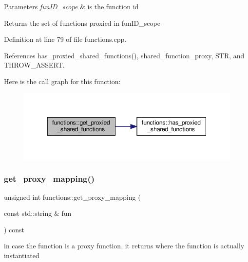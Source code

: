 \begin{DoxyParams}{Parameters}
{\em fun\+I\+D\+\_\+scope} & is the function id \\
\hline
\end{DoxyParams}
\begin{DoxyReturn}{Returns}
the set of functions proxied in fun\+I\+D\+\_\+scope 
\end{DoxyReturn}


Definition at line 79 of file functions.\+cpp.



References has\+\_\+proxied\+\_\+shared\+\_\+functions(), shared\+\_\+function\+\_\+proxy, S\+TR, and T\+H\+R\+O\+W\+\_\+\+A\+S\+S\+E\+RT.

Here is the call graph for this function\+:
\nopagebreak
\begin{figure}[H]
\begin{center}
\leavevmode
\includegraphics[width=344pt]{dd/d03/classfunctions_a0dc27d773ab21876d91082e54b100780_cgraph}
\end{center}
\end{figure}
\mbox{\label{classfunctions_aad881194f6ac949db8171c00ec263021}} 
\subsubsection{\texorpdfstring{get\+\_\+proxy\+\_\+mapping()}{get\_proxy\_mapping()}}
{\footnotesize\ttfamily unsigned int functions\+::get\+\_\+proxy\+\_\+mapping (\begin{DoxyParamCaption}\item[{const std\+::string \&}]{fun }\end{DoxyParamCaption}) const}



in case the function is a proxy function, it returns where the function is actually instantiated 


